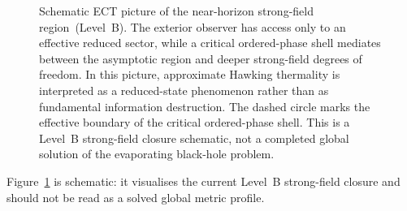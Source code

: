 \documentclass[11pt,a4paper]{article}
\numberwithin{equation}{section}
\begin{document}
\begin{figure}[h]
\centering
{}
\caption{Schematic ECT picture of the near-horizon strong-field region~(Level~B).
The exterior observer has access only to an effective reduced sector, while a
critical ordered-phase shell mediates between the asymptotic region and deeper
strong-field degrees of freedom.
In this picture, approximate Hawking thermality is interpreted as a reduced-state
phenomenon rather than as fundamental information destruction.
The dashed circle marks the effective boundary of the critical ordered-phase shell.
This is a Level~B strong-field closure schematic, not a completed global solution
of the evaporating black-hole problem.}
\label{fig:qs_bh_shell}
\end{figure}

Figure~\ref{fig:qs_bh_shell} is schematic: it visualises the current
Level~B strong-field closure and should not be read as a solved global
metric profile.
\end{document}
